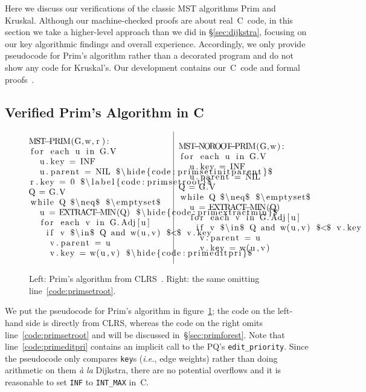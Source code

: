 Here we discuss our verifications of the classic MST algorithms Prim and Kruskal.  Although our machine-checked proofs are about real~C~code, in this section we take a higher-level approach than we did in \S\ref{sec:dijkstra}, focusing on our key algorithmic findings and overall experience.  Accordingly, we only provide pseudocode for Prim's algorithm rather than a decorated program and do not show any code for Kruskal's.  Our development contains our~C~code and formal proofs~\cite{blah}.

\subsection{Verified Prim's Algorithm in C}
\label{sec:prim}

\begin{figure}
\[
\begin{array}{@{}l@{~~}|@{~~}l@{}}
\begin{minipage}{0.475\textwidth}
\begin{lstlisting}
MST-PRIM(G,w,r):
 for each u in G.V
  u.key = INF
  u.parent = NIL $\hide{code:primsetinitparent}$
 r.key = 0 $\label{code:primsetroot}$
 Q = G.V
 while Q $\neq$ $\emptyset$
  u = EXTRACT-MIN(Q) $\hide{code:primextractmin}$
  for each v in G.Adj[u]
   if v $\in$ Q and w(u,v) $<$ v.key
    v.parent = u
    v.key = w(u,v) $\hide{code:primeditpri}$
\end{lstlisting} \end{minipage} &
\begin{minipage}{0.5\textwidth}
\begin{lstlisting}[numbers=none]
MST-NOROOT-PRIM(G,w):
 for each u in G.V
  u.key = INF
  u.parent = NIL

 Q = G.V
 while Q $\neq$ $\emptyset$
  u = EXTRACT-MIN(Q)
  for each v in G.Adj[u]
   if v $\in$ Q and w(u,v) $<$ v.key
    v.parent = u
    v.key = w(u,v)
\end{lstlisting}
\end{minipage}
\end{array}
\]
\caption{Left: Prim's algorithm from CLRS~\cite{clrs}. Right: the same omitting line~\ref{code:primsetroot}.}
\label{fig:prims}
\end{figure}

We put the pseudocode for Prim's algorithm in figure~\ref{fig:prims}; the code on the left-hand side is directly from CLRS, whereas the code on the right omits line~\ref{code:primsetroot} and will be discussed in~\S\ref{sec:primforest}.  Note that line~\ref{code:primeditpri} contains an implicit call to the PQ's \texttt{edit\_priority}.  Since the pseudocode only compares \texttt{key}s (\emph{i.e.}, edge weights) rather than doing arithmetic on them \emph{\`a la} Dijkstra, there are no potential overflows and it is reasonable to set \texttt{INF} to \texttt{INT\_MAX} in~C.

